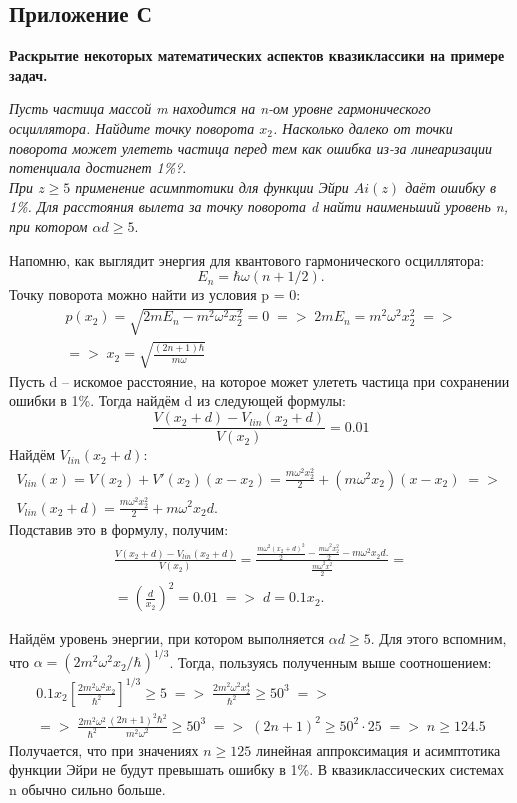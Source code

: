 \begin{center}
    \section{Приложение С}\label{appendix:C}
    \textbf{\Large{Раскрытие некоторых математических аспектов квазиклассики на примере задач.}}
\end{center}

\begin{center}
\textit{Пусть частица массой m находится на n-ом уровне гармонического осциллятора. Найдите точку поворота $x_2$. Насколько далеко от точки поворота может улететь частица перед тем как ошибка из-за линеаризации потенциала достигнет 1\%?}.\\
\textit{При $z\geq 5$ применение асимптотики для функции Эйри $Ai(z)$ даёт ошибку в 1\%. Для расстояния вылета за точку поворота d найти наименьший уровень n, при котором $\alpha d\geq 5$}.
\end{center}
Напомню, как выглядит энергия для квантового гармонического осциллятора: 
\[E_n = \hbar\omega(n + 1/2).\] Точку поворота можно найти из условия p = 0:
\begin{gather*} 
p(x_2) = \sqrt{2mE_n - m^2\omega^2x_2^2} = 0\; => \; 2mE_n = m^2\omega^2x_2^2 \; => \\
=>\; x_2 = \sqrt{\frac{(2n + 1)\hbar}{m\omega}}
\end{gather*}
Пусть d -- искомое расстояние, на которое может улететь частица при сохранении ошибки в 1\%. Тогда найдём d из следующей формулы:
\[
\frac{V(x_2 + d) - V_{lin}(x_2 + d)}{V(x_2)} = 0.01
\]
Найдём $V_{lin}(x_2 + d)$:
\begin{gather*}
V_{lin}(x) = V(x_2) + V'(x_2)(x - x_2) = \frac{m\omega^2 x_2^2}{2} + (m\omega^2 x_2)(x-x_2)\; => \;\\
V_{lin}(x_2 + d) = \frac{m\omega^2 x_2^2}{2} + m\omega^2 x_2d.
\end{gather*}
Подставив это в формулу, получим:
\begin{gather*}
    \frac{V(x_2 + d) - V_{lin}(x_2 + d)}{V(x_2)} = \frac{\frac{m\omega^2 (x_2 + d)^2}{2} - \frac{m\omega^2 x_2^2}{2} - m\omega^2 x_2d.}{\frac{m\omega^2 x^2}{2}} = \\
    = \left(\frac{d}{x_2}\right)^2 =  0.01\; => \; d = 0.1x_2.
\end{gather*}

Найдём уровень энергии, при котором выполняется $\alpha d \geq 5$. Для этого вспомним, что $\alpha = (2m^2\omega^2x_2/\hbar)^{1/3}$. Тогда, пользуясь полученным выше соотношением:
\begin{gather*}
    0.1x_2\left[\frac{2m^2\omega^2x_2}{\hbar^2}\right]^{1/3} \geq 5\; => \; \frac{2m^2\omega^2 x_2^4}{\hbar^2} \geq 50^3 \; => \\
    => \; \frac{2m^2\omega^2}{\hbar^2} \frac{(2n + 1)^2\hbar^2}{m^2\omega^2} \geq 50^3 \; => \; (2n+1)^2 \geq 50^2 \cdot 25 \; => \; n \geq 124.5
\end{gather*}
Получается, что при значениях $n\geq 125$ линейная аппроксимация и асимптотика функции Эйри не будут превышать ошибку в 1\%. В квазиклассических системах n обычно сильно больше.

